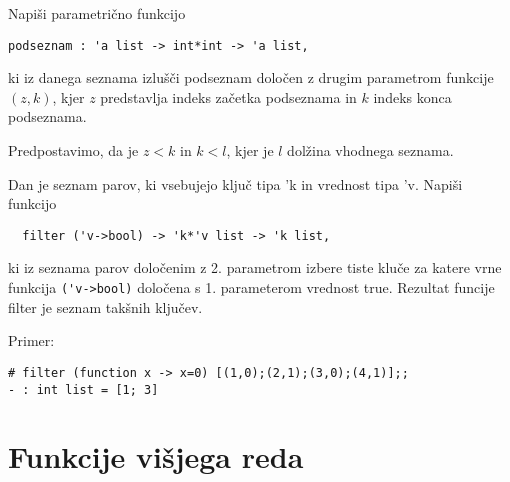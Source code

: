 \begin{ex}
Napi\v si parametri\v cno funkcijo 
\begin{lstlisting}
podseznam : 'a list -> int*int -> 'a list, 
\end{lstlisting}
ki iz danega seznama izlu\v s\v ci podseznam dolo\v cen z drugim parametrom funkcije $(z,k)$, 
kjer $z$ predstavlja indeks za\v cetka podseznama in $k$ indeks konca podseznama. 

Predpostavimo, da je $z<k$ in $k<l$, kjer je $l$ dol\v zina vhodnega seznama. 

\end{ex} 
\begin{ex}
  Dan je seznam parov, ki vsebujejo klju\v c tipa 'k in vrednost tipa
  'v. Napi\v si funkcijo
\begin{lstlisting}
  filter ('v->bool) -> 'k*'v list -> 'k list,
\end{lstlisting}
  ki iz seznama parov dolo\v cenim z 2. parametrom izbere tiste klu\v
  ce za katere vrne funkcija \lstinline{('v->bool)} dolo\v cena s 1. parameterom
  vrednost true. Rezultat funcije filter je seznam tak\v snih klju\v
  cev.

\noindent\/Primer:
\begin{lstlisting}
# filter (function x -> x=0) [(1,0);(2,1);(3,0);(4,1)];; 
- : int list = [1; 3] 

\end{lstlisting}

\end{ex} 

\section{Funkcije vi\v sjega reda}


